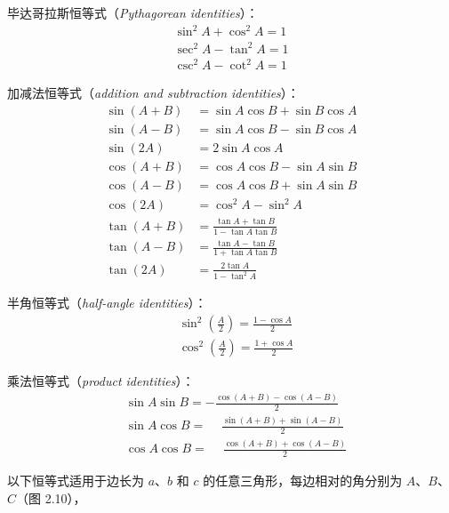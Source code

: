 毕达哥拉斯恒等式（\textit{Pythagorean identities}）：
\[
  \begin{array}{r}
    \sin ^{2} A+\cos ^{2} A=1 \\
    \sec ^{2} A-\tan ^{2} A=1 \\
    \csc ^{2} A-\cot ^{2} A=1
  \end{array}
\]

加减法恒等式（\textit{addition and subtraction identities}）：
\[
  \begin{aligned}
    \sin (A+B) & =\sin A \cos B+\sin B \cos A             \\
    \sin (A-B) & =\sin A \cos B-\sin B \cos A             \\
    \sin (2 A) & =2 \sin A \cos A                         \\
    \cos (A+B) & =\cos A \cos B-\sin A \sin B             \\
    \cos (A-B) & =\cos A \cos B+\sin A \sin B             \\
    \cos (2 A) & =\cos ^{2} A-\sin ^{2} A                 \\
    \tan (A+B) & =\frac{\tan A+\tan {B}}{1-\tan A \tan B} \\
    \tan (A-B) & =\frac{\tan A-\tan B}{1+\tan A \tan B}   \\
    \tan (2 A) & =\frac{2 \tan A}{1-\tan^{2}A}
  \end{aligned}
\]

半角恒等式（\textit{half-angle identities}）：
\[
  \begin{aligned}
     & \sin ^{2}(\frac{A}{2})=\frac{1-\cos A}{2} \\
     & \cos ^{2}(\frac{A}{2})=\frac{1+\cos A}{2}
  \end{aligned}
\]

乘法恒等式（\textit{product identities}）：
\[
  \begin{aligned}
     & \sin A \sin B=-\frac{\cos (A+B)-\cos (A-B)}{2}           \\
     & \sin A \cos B=\phantom{-}\frac{\sin (A+B)+\sin (A-B)}{2} \\
     & \cos A \cos B=\phantom{-}\frac{\cos (A+B)+\cos (A-B)}{2}
  \end{aligned}
\]

以下恒等式适用于边长为 $a$、$b$ 和 $c$ 的任意三角形，每边相对的角分别为 $A$、$B$、$C$（图 2.10），


